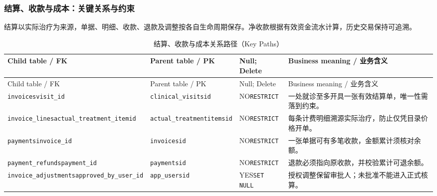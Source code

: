 \subsubsection{结算、收款与成本：关键关系与约束}
结算以实际治疗为来源，单据、明细、收款、退款及调整按各自生命周期保存。净收款根据有效资金流水计算，历史交易保持可追溯。

\begingroup\footnotesize\setlength{\tabcolsep}{3pt}
\begin{longtable}{@{}L{43mm}L{32mm}L{24mm}L{49mm}@{}}
\caption{结算、收款与成本关系路径（Key Paths）}\label{tab:domain-key-07}\\\toprule
Child table / FK & Parent table / PK & Null; Delete & Business meaning / 业务含义\\\midrule\endfirsthead
\toprule Child table / FK & Parent table / PK & Null; Delete & Business meaning / 业务含义\\\midrule\endhead
\texttt{invoices}\newline\texttt{visit\_id} & \texttt{clinical\_visits}\newline\texttt{id} & NO\newline\texttt{RESTRICT} & 一处就诊至多开具一张有效结算单，唯一性需落到约束。\\
\texttt{invoice\_lines}\newline\texttt{actual\_treatment\_item}\newline\texttt{id} & \texttt{actual\_treatment}\newline\texttt{items}\newline\texttt{id} & NO\newline\texttt{RESTRICT} & 每条计费明细溯源实际治疗，防止仅凭目录价格开单。\\
\texttt{payments}\newline\texttt{invoice\_id} & \texttt{invoices}\newline\texttt{id} & NO\newline\texttt{RESTRICT} & 一张单据可有多笔收款，金额累计须核对余额。\\
\texttt{payment\_refunds}\newline\texttt{payment\_id} & \texttt{payments}\newline\texttt{id} & NO\newline\texttt{RESTRICT} & 退款必须指向原收款，并校验累计可退余额。\\
\texttt{invoice\_adjustments}\newline\texttt{approved\_by\_user\_id} & \texttt{app\_users}\newline\texttt{id} & YES\newline\texttt{SET NULL} & 授权调整保留审批人；未批准不能进入正式核算。\\

\end{longtable}

